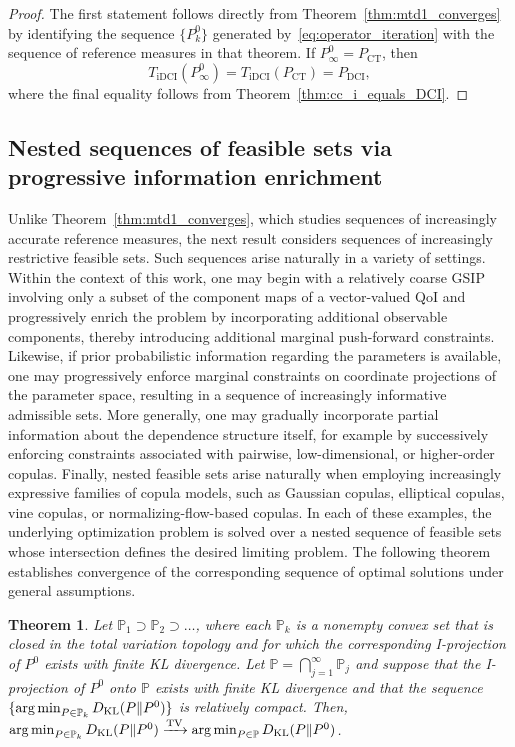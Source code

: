 \documentclass{article}
\newcounter{example}[section]
\newtheorem{theorem}{Theorem}[section]
\newcommand{\p}{\mathbb{P}}
\DeclareMathOperator*{\argmin}{arg\,min}
\begin{document}
\begin{proof}
The first statement follows directly from Theorem~\ref{thm:mtd1_converges} by identifying the sequence $\{P_k^0\}$ generated by~\eqref{eq:operator_iteration}
with the sequence of reference measures in that theorem. If $P_\infty^0=P_{\mathrm{CT}}$, then
\[
T_{\mathrm{iDCI}}(P_\infty^0)
=
T_{\mathrm{iDCI}}(P_{\mathrm{CT}})
=
P_{\mathrm{DCI}},
\]
where the final equality follows from Theorem~\ref{thm:cc_i_equals_DCI}.
\end{proof}

\subsection{Nested sequences of feasible sets via progressive information enrichment}\label{subsec:nested-feasible}

Unlike Theorem~\ref{thm:mtd1_converges}, which studies sequences of increasingly accurate reference measures, the next result considers sequences of increasingly restrictive feasible sets.
Such sequences arise naturally in a variety of settings.
Within the context of this work, one may begin with a relatively coarse GSIP involving only a subset of the component maps of a vector-valued QoI and progressively enrich the problem by incorporating additional observable components, thereby introducing additional marginal push-forward constraints.
Likewise, if prior probabilistic information regarding the parameters is available, one may progressively enforce marginal constraints on coordinate projections of the parameter space, resulting in a sequence of increasingly informative admissible sets.
More generally, one may gradually incorporate partial information about the dependence structure itself, for example by successively enforcing constraints associated with pairwise, low-dimensional, or higher-order copulas.
Finally, nested feasible sets arise naturally when employing increasingly expressive families of copula models, such as Gaussian copulas, elliptical copulas, vine copulas, or normalizing-flow-based copulas.
In each of these examples, the underlying optimization problem is solved over a nested sequence of feasible sets whose intersection defines the desired limiting problem.
The following theorem establishes convergence of the corresponding sequence of optimal solutions under general assumptions.

\begin{theorem}\label{thm:mtd2_converges}
Let $\p_{1} \supset \p_{2} \supset \dots$, where each $\p_k$ is a nonempty convex set that is closed in the total variation topology and for which the corresponding I-projection of $P^0$ exists with finite KL divergence.
Let $\p= \bigcap_{j=1}^{\infty}\p_j$ and suppose that the I-projection of $P^0$ onto $\p$ exists with finite KL divergence and that
the sequence $\{\argmin_{P \in \p_{k}}D_{\rm KL}(P \| P^{0})\}$ is relatively compact.
Then,
$
\argmin_{P \in \p_{k}}D_{\rm KL}(P \| P^{0})
\xrightarrow{\mathrm{TV}}
\argmin_{P \in \p}D_{\rm KL}(P \| P^{0})
$.
\end{theorem}
\end{document}
